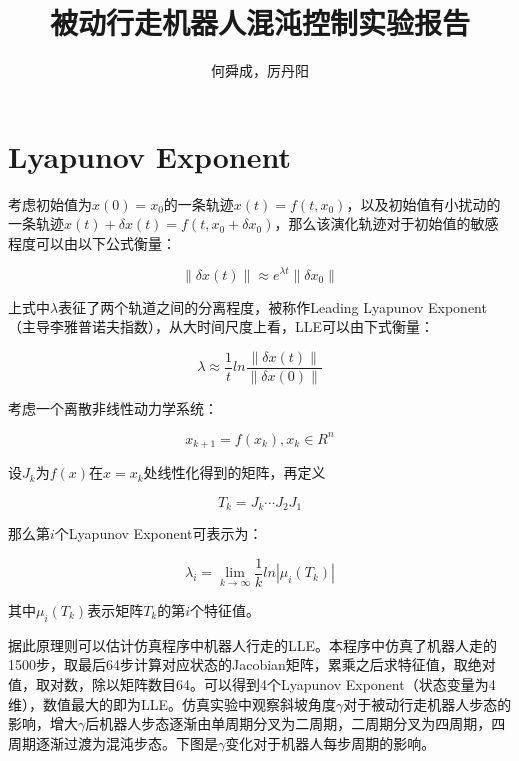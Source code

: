 \documentclass[UTF8]{ctexart}
\author{何舜成，厉丹阳}
\title{被动行走机器人混沌控制实验报告}
\begin{document}
\maketitle
\section{Lyapunov Exponent}
考虑初始值为$x(0)=x_{0}$的一条轨迹$x(t)=f(t,x_{0})$，以及初始值有小扰动的一条轨迹$x(t)+\delta x(t)=f(t,x_{0}+\delta x_{0})$，那么该演化轨迹对于初始值的敏感程度可以由以下公式衡量：\par
\begin{equation}
\parallel \delta x(t)\parallel \approx e^{\lambda t}\parallel \delta x_{0}\parallel
\end{equation}
\par
上式中$\lambda$表征了两个轨道之间的分离程度，被称作Leading Lyapunov Exponent（主导李雅普诺夫指数），从大时间尺度上看，LLE可以由下式衡量：\par
\begin{equation}
\lambda \approx \frac{1}{t}ln\frac{\parallel\delta x(t)\parallel}{\parallel\delta x(0)\parallel}
\end{equation}
\par
考虑一个离散非线性动力学系统：\par
\begin{equation}
x_{k+1}=f(x_{k}),x_{k}\in R^{n}
\end{equation}
\par
设$J_{k}$为$f(x)$在$x=x_{k}$处线性化得到的矩阵，再定义\par
\begin{equation}
T_{k}=J_{k}\cdots J_{2}J_{1}
\end{equation}
\par
那么第$i$个Lyapunov Exponent可表示为：\par
\begin{equation}
\lambda_{i}=\lim_{k \to \infty}\frac{1}{k}ln|\mu_{i}(T_{k})|
\end{equation}
\par
其中$\mu_{i}(T_{k})$表示矩阵$T_{k}$的第$i$个特征值。\par
据此原理则可以估计仿真程序中机器人行走的LLE。本程序中仿真了机器人走的1500步，取最后64步计算对应状态的Jacobian矩阵，累乘之后求特征值，取绝对值，取对数，除以矩阵数目64。可以得到4个Lyapunov Exponent（状态变量为4维），数值最大的即为LLE。仿真实验中观察斜坡角度$\gamma$对于被动行走机器人步态的影响，增大$\gamma$后机器人步态逐渐由单周期分叉为二周期，二周期分叉为四周期，四周期逐渐过渡为混沌步态。下图是$\gamma$变化对于机器人每步周期的影响。\par
\end{document}

